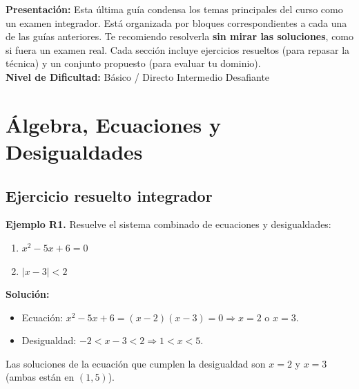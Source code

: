 \documentclass[12pt, a4paper]{article}
\begin{document}


\vspace{4pt}
\begin{cuadroinfo}
  \small
  \textbf{Presentación:} Esta última guía condensa los temas principales del curso como un examen integrador. Está organizada por bloques correspondientes a cada una de las guías anteriores. Te recomiendo resolverla \textbf{sin mirar las soluciones}, como si fuera un examen real. Cada sección incluye ejercicios resueltos (para repasar la técnica) y un conjunto propuesto (para evaluar tu dominio).
  \\[4pt]
  \textbf{Nivel de Dificultad:}\quad
  \facil{} Básico / Directo \quad
  \medio{} Intermedio \quad
  \dificil{} Desafiante
\end{cuadroinfo}

\vspace{8pt}

\section{Álgebra, Ecuaciones y Desigualdades}

\subsection{Ejercicio resuelto integrador}

\textbf{Ejemplo R1.} Resuelve el sistema combinado de ecuaciones y desigualdades:
\begin{enumerate}[label=\roman*)]
  \item $x^2 - 5x + 6 = 0$
  \item $|x - 3| < 2$
\end{enumerate}

\begin{cuadrosolucion}
  \textbf{Solución:}
  \begin{itemize}
    \item Ecuación: $x^2 - 5x + 6 = (x - 2)(x - 3) = 0 \Rightarrow x = 2$ o $x = 3$.
    \item Desigualdad: $-2 < x - 3 < 2 \Rightarrow 1 < x < 5$.
  \end{itemize}
  Las soluciones de la ecuación que cumplen la desigualdad son $x = 2$ y $x = 3$ (ambas están en $(1, 5)$).
\end{cuadrosolucion}
\end{document}
